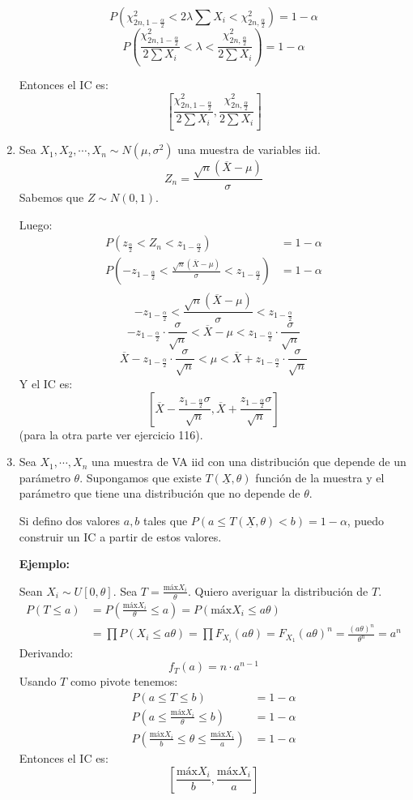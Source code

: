 \begin{enumerate}
		$$P(\chi^2_{2n, 1-\frac{\alpha}{2}} < 2\lambda\sum X_i < \chi^2_{2n, \frac{\alpha}{2}}) = 1 - \alpha$$
		$$P\left(\frac{\chi^2_{2n, 1-\frac{\alpha}{2}}}{2\sum X_i} < \lambda < \frac{\chi^2_{2n, \frac{\alpha}{2}}}{2\sum X_i}\right) = 1 - \alpha$$
		
		Entonces el IC es:
		$$\left[\frac{\chi^2_{2n, 1-\frac{\alpha}{2}}}{2\sum X_i}, \frac{\chi^2_{2n, \frac{\alpha}{2}}}{2\sum X_i}\right]$$
	\item
		Sea $X_1, X_2, \cdots, X_n \sim N(\mu, \sigma^2)$ una muestra de variables iid.
		$$Z_n = \frac{\sqrt{n}(\overline X - \mu)}{\sigma}$$
		Sabemos que $Z\sim N(0,1)$.
		
		Luego:
		\begin{align*}
			P(z_{\frac{\alpha}{2}} < Z_n < z_{1-\frac{\alpha}{2}})	& = 1 - \alpha	\\
			P\left(-z_{1-\frac{\alpha}{2}} < \frac{\sqrt{n}(\overline X - \mu)}{\sigma} < z_{1-\frac{\alpha}{2}}\right)	& = 1 - \alpha	\\
		\end{align*}
		$$-z_{1-\frac{\alpha}{2}} < \frac{\sqrt{n}(\overline X - \mu)}{\sigma} < z_{1-\frac{\alpha}{2}}$$
		$$-z_{1-\frac{\alpha}{2}}\cdot\frac{\sigma}{\sqrt{n}} < \overline X - \mu < z_{1-\frac{\alpha}{2}}\cdot\frac{\sigma}{\sqrt{n}}$$
		$$\overline X - z_{1-\frac{\alpha}{2}}\cdot\frac{\sigma}{\sqrt{n}} < \mu < \overline X + z_{1-\frac{\alpha}{2}}\cdot\frac{\sigma}{\sqrt{n}}$$
		Y el IC es:
		$$\left[\overline X - \frac{z_{1-\frac{\alpha}{2}}\sigma}{\sqrt{n}} ,  \overline X + \frac{z_{1-\frac{\alpha}{2}}\sigma}{\sqrt{n}}\right]$$
		(para la otra parte ver ejercicio 116).
	\item
		Sea $X_1, \cdots, X_n$ una muestra de VA iid con una distribución que depende de un parámetro $\theta$.
		Supongamos que existe $T(\underline X, \theta)$ función de la muestra y el parámetro que tiene una distribución que no depende de $\theta$.
		
		Si defino dos valores $a,b$ tales que $P(a \leq T(\underline X, \theta) < b) = 1-\alpha$, puedo construir un IC a partir de estos valores.
		
		\textbf{Ejemplo:}
		
		Sean $X_i\sim U[0,\theta]$. Sea $T = \frac{\text{máx}X_i}{\theta}$.
		Quiero averiguar la distribución de $T$.
		\begin{align*}
			P(T \leq a)	& = P\left(\frac{\text{máx}X_i}{\theta} \leq a\right) = P(\text{máx}X_i \leq a\theta)	\\
						& = \prod P(X_i \leq a\theta) = \prod F_{X_i}(a\theta) = F_{X_1}(a\theta)^n = \frac{(a\theta)^n}{\theta^n} = a^n
		\end{align*}
		Derivando:
		$$f_T(a) = n \cdot a^{n-1}$$
		Usando $T$ como pivote tenemos:
		\begin{align*}
			P(a\leq T \leq b)	& = 1-\alpha	\\
			P\left(a\leq \frac{\text{máx}X_i}{\theta}\leq b\right)	& = 1-\alpha	\\
			P\left(\frac{\text{máx}X_i}{b}\leq \theta\leq \frac{\text{máx}X_i}{a}\right)	& = 1-\alpha
		\end{align*}
		Entonces el IC es:
		$$\left[\frac{\text{máx}X_i}{b}, \frac{\text{máx}X_i}{a}\right]$$
		

\end{enumerate}
